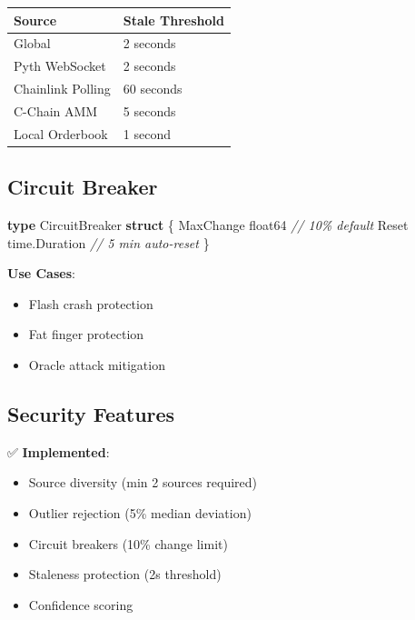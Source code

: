 \documentclass[
]{article}
\newenvironment{Shaded}{}{}
\newcommand{\CommentTok}[1]{\textcolor[rgb]{0.38,0.63,0.69}{\textit{#1}}}
\newcommand{\DataTypeTok}[1]{\textcolor[rgb]{0.56,0.13,0.00}{#1}}
\newcommand{\KeywordTok}[1]{\textcolor[rgb]{0.00,0.44,0.13}{\textbf{#1}}}
\newcommand{\NormalTok}[1]{#1}
\newcommand{\OperatorTok}[1]{\textcolor[rgb]{0.40,0.40,0.40}{#1}}
\newcounter{none} %
\providecommand{\tightlist}{%
  \setlength{\itemsep}{0pt}\setlength{\parskip}{0pt}}
\begin{document}
{\def\LTcaptype{none} %
\begin{longtable}[]{@{}ll@{}}
\toprule\noalign{}
Source & Stale Threshold \\
\midrule\noalign{}
\endhead
\bottomrule\noalign{}
\endlastfoot
Global & 2 seconds \\
Pyth WebSocket & 2 seconds \\
Chainlink Polling & 60 seconds \\
C-Chain AMM & 5 seconds \\
Local Orderbook & 1 second \\
\end{longtable}
}

\subsection{Circuit Breaker}\label{circuit-breaker}

\begin{Shaded}
\begin{Highlighting}[]
\KeywordTok{type}\NormalTok{ CircuitBreaker }\KeywordTok{struct} \OperatorTok{\{}
\NormalTok{    MaxChange }\DataTypeTok{float64}       \CommentTok{// 10\% default}
\NormalTok{    Reset     time}\OperatorTok{.}\NormalTok{Duration }\CommentTok{// 5 min auto{-}reset}
\OperatorTok{\}}
\end{Highlighting}
\end{Shaded}

\textbf{Use Cases}:

\begin{itemize}
\tightlist
\item
  Flash crash protection
\item
  Fat finger protection
\item
  Oracle attack mitigation
\end{itemize}

\subsection{Security Features}\label{security-features}

✅ \textbf{Implemented}:

\begin{itemize}
\tightlist
\item
  Source diversity (min 2 sources required)
\item
  Outlier rejection (5\% median deviation)
\item
  Circuit breakers (10\% change limit)
\item
  Staleness protection (2s threshold)
\item
  Confidence scoring
\end{itemize}
\end{document}
